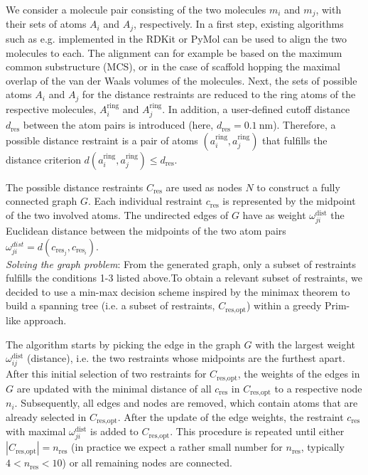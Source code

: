 We consider a molecule pair consisting of the two molecules $m_i$ and $m_j$, with their sets of atoms $A_i$ and $A_j$, respectively. 
In a first step, existing algorithms such as e.g. implemented in the RDKit\cite{Landrum2021} or PyMol\cite{Delano2020} can be used to align the two molecules to each. The alignment can for example be based on the maximum common substructure (MCS), or in the case of scaffold hopping the maximal overlap of the van der Waals volumes of the molecules.
Next, the sets of possible atoms $A_i$ and $A_j$ for the distance restraints are reduced to the ring atoms of the respective molecules, $A^\text{ring}_i$ and $A^\text{ring}_j$. 
In addition, a user-defined cutoff distance $d_\text{res}$ between the atom pairs is introduced (here, $d_\text{res} = 0.1~\text{nm}$). 
Therefore, a possible distance restraint is a pair of atoms $(a^\text{ring}_i, a^\text{ring}_j)$ that fulfills the distance criterion $d(a^\text{ring}_i, a^\text{ring}_j) \leq d_\text{res}$.

The possible distance restraints $C_\text{res}$ are used as nodes $N$ to construct a fully connected graph $G$. 
Each individual restraint $c_\text{res}$ is represented by the midpoint of the two involved atoms.
The undirected edges of $G$ have as weight $\omega^\text{dist}_{ji}$ the Euclidean distance between the midpoints of the two atom pairs $\omega^{dist}_{ji}=d(c_{\text{res}_j},c_{\text{res}_i})$. \\

\noindent\textit{Solving the graph problem}:
From the generated graph, only a subset of restraints fulfills the conditions 1-3 listed above.To obtain a relevant subset of restraints, we decided to use a min-max decision scheme inspired by the minimax theorem \cite{Neumann1928} to build a spanning tree (i.e. a subset of restraints, $C_\text{res,opt}$) within a greedy Prim-like approach.\cite{Prim1957}

The algorithm starts by picking the edge in the graph $G$ with the largest weight $\omega^\text{dist}_{ij}$ (distance), i.e. the two restraints whose midpoints are the furthest apart. 
After this initial selection of two restraints for $C_\text{res,opt}$, the weights of the edges in $G$ are updated with the minimal distance of all $c_\text{res}$ in $C_\text{res,opt}$ to a respective node $n_i$. Subsequently, all edges and nodes are removed, which contain atoms that are already selected in $C_\text{res,opt}$.
After the update of the edge weights, the restraint $c_\text{res}$ with maximal $\omega^\text{dist}_{ji}$ is added to $C_\text{res,opt}$.
This procedure is repeated until either $|C_\text{res,opt}| = n_\text{res}$ (in practice we expect a rather small number for $n_\text{res}$, typically $ 4 < n_\text{res} < 10$) or all remaining nodes are connected. \\

